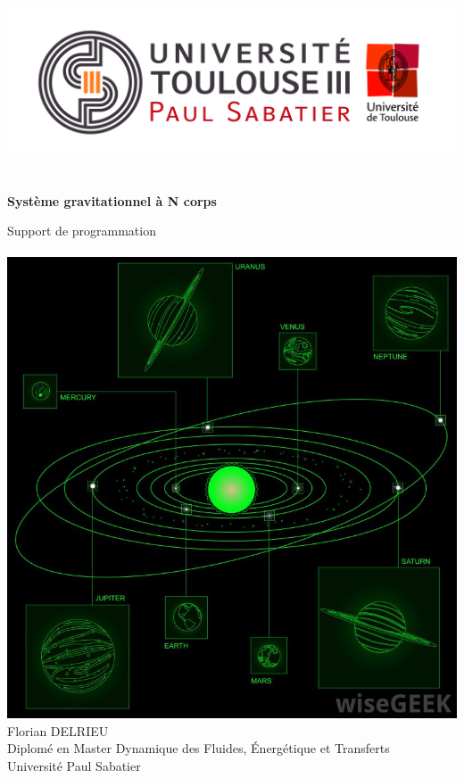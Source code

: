 \documentclass[9pt,a4paper,titlepage,twoside,twocolumn]{report}
\begin{document}
\begin{titlepage}
	\begin{center}
		\includegraphics[scale=0.3]{Images/logo.jpg} \\[2cm]
		\Hrule \\[1cm]
		\begin{Huge}
		\textbf{ Système gravitationnel à N corps } \\[0.5cm]
		\end{Huge}
		Support de programmation \\[0.5cm]
		\Hrule \\[1.5cm]
		
		\includegraphics[scale=0.45]{Images/SolarSystem.jpg} \\[1.5cm]
		
		Florian DELRIEU \\[0.5cm]
		Diplomé en Master Dynamique des Fluides, Énergétique et Transferts \\
		Université Paul Sabatier
		
	\end{center}
\end{titlepage}
\end{document}
